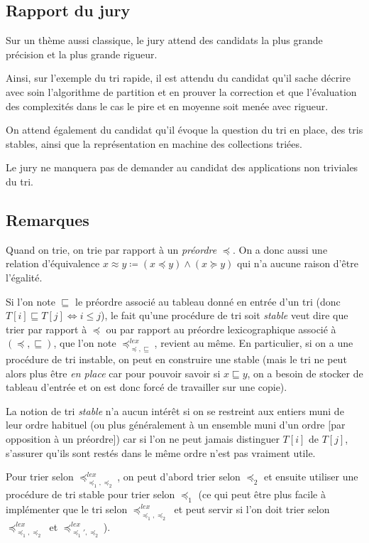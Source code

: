 \documentclass[../../Agregation.tex]{subfiles}
\begin{document}

\subsection{Rapport du jury}

\begin{aquote}{}
Sur un thème aussi classique, le jury attend des candidats la plus grande précision et la plus grande rigueur.

Ainsi, sur l'exemple du tri rapide, il est attendu du candidat qu'il sache décrire avec soin l'algorithme de partition et en prouver la correction et que l'évaluation des complexités dans le cas le pire et en moyenne soit menée avec rigueur.

On attend également du candidat qu'il évoque la question du tri en place, des tris stables, ainsi que la représentation en machine des collections triées.

Le jury ne manquera pas de demander au candidat des applications non triviales du tri.
\end{aquote}

\subsection{Remarques}

Quand on trie, on trie par rapport à un \emph{préordre} $\preccurlyeq$. On a donc aussi une relation d'équivalence $x\approx y\coloneqq (x\preccurlyeq y) \land (x\succcurlyeq y)$ qui n'a aucune raison d'être l'égalité.

Si l'on note $\sqsubseteq$ le préordre associé au tableau donné en entrée d'un tri (donc $T[i]\sqsubseteq T[j] \iff i \le j$), le fait qu'une procédure de tri soit \emph{stable} veut dire que trier par rapport à $\preccurlyeq$ ou par rapport au préordre lexicographique associé à $(\preccurlyeq, \sqsubseteq)$, que l'on note $\preccurlyeq^{lex}_{\preccurlyeq, \sqsubseteq}$, revient au même. En particulier, si on a une procédure de tri instable, on peut en construire une stable (mais le tri ne peut alors plus être \emph{en place} car pour pouvoir savoir si $x\sqsubseteq y$, on a besoin de stocker de tableau d'entrée et on est donc forcé de travailler sur une copie).

La notion de tri \emph{stable} n'a aucun intérêt si on se restreint aux entiers muni de leur ordre habituel (ou plus généralement à un ensemble muni d'un ordre [par opposition à un préordre]) car si l'on ne peut jamais distinguer $T[i]$ de $T[j]$, s'assurer qu'ils sont restés dans le même ordre n'est pas vraiment utile.

Pour trier selon $\preccurlyeq^{lex}_{\preccurlyeq_1, \preccurlyeq_2}$, on peut d'abord trier selon $\preccurlyeq_2$ et ensuite utiliser une procédure de tri stable pour trier selon $\preccurlyeq_1$ (ce qui peut être plus facile à implémenter que le tri selon $\preccurlyeq^{lex}_{\preccurlyeq_1, \preccurlyeq_2}$ et peut servir si l'on doit trier selon $\preccurlyeq^{lex}_{\preccurlyeq_1, \preccurlyeq_2}$ et $\preccurlyeq^{lex}_{\preccurlyeq_1', \preccurlyeq_2}$).
\end{document}
